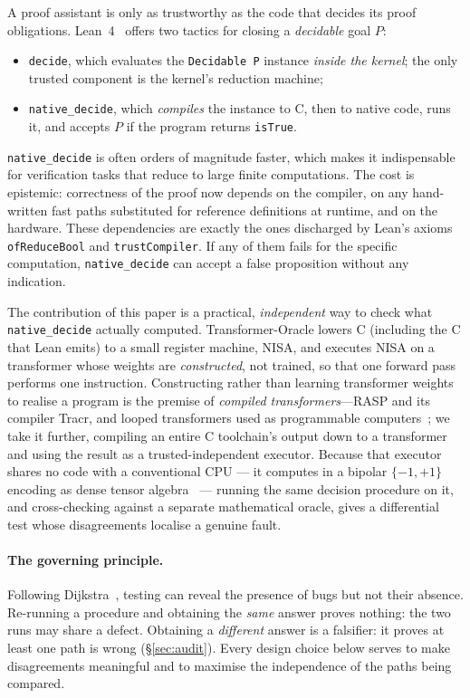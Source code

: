 \documentclass[11pt]{article}
\theoremstyle{definition}
\theoremstyle{plain}
\theoremstyle{remark}
\newcommand{\bp}{\{-1,+1\}}
\begin{document}
A proof assistant is only as trustworthy as the code that decides its proof obligations. Lean~4~\cite{demoura2021}
offers two tactics for closing a \emph{decidable} goal $P$:
\begin{itemize}[nosep]
  \item \texttt{decide}, which evaluates the \texttt{Decidable P} instance \emph{inside the kernel};
        the only trusted component is the kernel's reduction machine;
  \item \texttt{native\_decide}, which \emph{compiles} the instance to C, then to native code, runs
        it, and accepts $P$ if the program returns \texttt{isTrue}.
\end{itemize}
\texttt{native\_decide} is often orders of magnitude faster, which makes it indispensable for
verification tasks that reduce to large finite computations. The cost is epistemic: correctness of
the proof now depends on the compiler, on any hand-written fast paths substituted for reference
definitions at runtime, and on the hardware. These dependencies are exactly the ones discharged by
Lean's axioms \texttt{ofReduceBool} and \texttt{trustCompiler}. If any of them fails for the specific
computation, \texttt{native\_decide} can accept a false proposition without any indication.

The contribution of this paper is a practical, \emph{independent} way to check what
\texttt{native\_decide} actually computed. Transformer-Oracle lowers C (including the C that Lean emits) to a
small register machine, NISA, and executes NISA on a transformer whose weights are \emph{constructed},
not trained, so that one forward pass performs one instruction. Constructing rather than learning
transformer weights to realise a program is the premise of \emph{compiled transformers}---RASP and its
compiler Tracr, and looped transformers used as programmable computers~\cite{weiss2021,lindner2023,giannou2023};
we take it further, compiling an entire C toolchain's output down to a transformer and using the result
as a trusted-independent executor. Because that executor shares no code with a conventional CPU --- it
computes in a bipolar $\bp$ encoding as dense tensor algebra~\cite{vaswani2017} --- running the same
decision procedure on it, and cross-checking against a separate mathematical oracle, gives a
differential test whose disagreements localise a genuine fault.

\paragraph{The governing principle.} Following Dijkstra~\cite{dijkstra1970}, testing can reveal the presence of bugs but
not their absence. Re-running a procedure and obtaining the \emph{same} answer proves nothing: the two
runs may share a defect. Obtaining a \emph{different} answer is a falsifier: it proves at least one
path is wrong (\S\ref{sec:audit}). Every design choice below serves to make disagreements meaningful
and to maximise the independence of the paths being compared.
\end{document}
